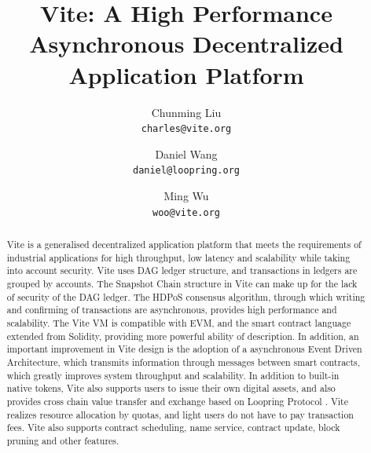 \documentclass[UTF8,nofonts]{article}
\title{\textbf{Vite: A High Performance Asynchronous Decentralized Application Platform}}
\author{
  Chunming Liu\\
  \texttt{charles@vite.org}\\
  \and
  Daniel Wang\\
  \texttt{daniel@loopring.org}\\
  \and
  Ming Wu\\
  \texttt{woo@vite.org}\\
 }
\date{}
\begin{document}
\maketitle

\begin{abstract}
Vite is a generalised decentralized application platform that meets the requirements of industrial applications for high throughput, low latency and scalability while taking into account security. Vite uses DAG ledger structure, and transactions in ledgers are grouped by accounts. The Snapshot Chain structure in Vite can make up for the lack of security of the DAG ledger. The HDPoS consensus algorithm, through which writing and confirming of transactions are asynchronous, provides high performance and scalability. The Vite VM is compatible with EVM, and the smart contract language extended from Solidity, providing more powerful ability of description. In addition, an important improvement in Vite design is the adoption of a asynchronous Event Driven  Architecture, which transmits information through messages between smart contracts, which greatly improves system throughput and scalability. In addition to built-in native tokens, Vite also supports users to issue their own digital assets, and also provides cross chain value transfer and  exchange based on Loopring Protocol \cite{loopring}. Vite realizes resource allocation by quotas, and light  users do not have to pay transaction fees. Vite also supports contract scheduling, name service, contract update, block pruning and other features.

\end{abstract}
\end{document}

